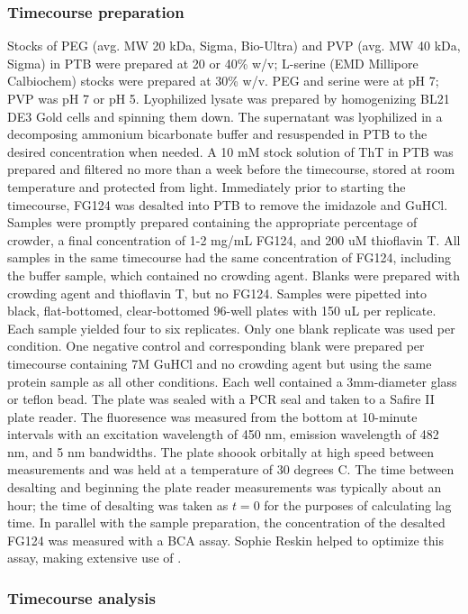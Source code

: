 \subsubsection{Timecourse preparation} Stocks of PEG (avg. MW 20 kDa, Sigma, Bio-Ultra) and PVP (avg. MW 40 kDa, Sigma) in PTB were prepared at 20 or 40\% w/v; L-serine (EMD Millipore Calbiochem) stocks were prepared at 30\% w/v.  PEG and serine were at pH 7; PVP was pH 7 or pH 5.  Lyophilized lysate was prepared by homogenizing BL21 DE3 Gold cells and spinning them down.  The supernatant was lyophilized in a decomposing ammonium bicarbonate buffer and resuspended in PTB to the desired concentration when needed.  A 10 mM stock solution of ThT in PTB was prepared and filtered no more than a week before the timecourse, stored at room temperature and protected from light.  Immediately prior to starting the timecourse, FG124 was desalted into PTB to remove the imidazole and GuHCl.  Samples were promptly prepared containing the appropriate percentage of crowder, a final concentration of 1-2 mg/mL FG124, and 200 uM thioflavin T.  All samples in the same timecourse had the same concentration of FG124, including the buffer sample, which contained no crowding agent.  Blanks were prepared with crowding agent and thioflavin T, but no FG124.  Samples were pipetted into black, flat-bottomed, clear-bottomed 96-well plates with 150 uL per replicate.  Each sample yielded four to six replicates.  Only one blank replicate was used per condition.  One negative control and corresponding blank were prepared per timecourse containing 7M GuHCl and no crowding agent but using the same protein sample as all other conditions.  Each well contained a 3mm-diameter glass or teflon bead.  The plate was sealed with a PCR seal and taken to a Safire II plate reader.  The fluoresence was measured from the bottom at 10-minute intervals with an excitation wavelength of 450 nm, emission wavelength of 482 nm, and 5 nm bandwidths.  The plate shoook orbitally at high speed between measurements and was held at a temperature of 30 degrees C.  The time between desalting and beginning the plate reader measurements was typically about an hour; the time of desalting was taken as $t=0$ for the purposes of calculating lag time. In parallel with the sample preparation, the concentration of the desalted FG124 was measured with a BCA assay.  Sophie Reskin helped to optimize this assay, making extensive use of \cite{giehm10}.

\subsubsection{Timecourse analysis}

